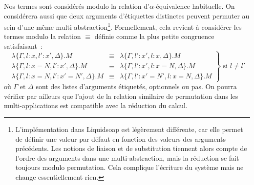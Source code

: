 \documentclass[twoside]{article}
\newcommand{\liquidsoap}{Liquidsoap}
\theoremstyle{plain}
\theoremstyle{definition}
\theoremstyle{remark}
\begin{document}
Nos termes sont considérés modulo la relation d'$\alpha$-équivalence
habituelle. On considérera aussi que deux arguments d'étiquettes distinctes
peuvent permuter au sein d'une même multi-abstraction\footnote{L'implémentation
  dans \liquidsoap{} est légèrement différente, car elle permet de définir une
  valeur par défaut en fonction des valeurs des arguments précédents. Les
  notions de liaison et de substitution tiennent alors compte de l'ordre des
  arguments dans une multi-abstraction, mais la réduction se fait toujours
  modulo permutation. Cela complique l'écriture du système mais ne change
  essentiellement rien.}. Formellement, cela revient à considérer les termes
modulo la relation $\equiv$ définie comme la plus petite congruence
satisfaisant~:
\begin{equation}
  \label{eq:permutation}
 \left.\begin{array}{rcl}
 \lambda \{ \Gamma, l:x, l':x', \Delta \}.M & \equiv &
 \lambda \{ \Gamma, l':x', l:x, \Delta \}.M \\
 \lambda \{ \Gamma, l:x=N, l':x', \Delta \}.M & \equiv &
 \lambda \{ \Gamma, l':x', l:x=N, \Delta \}.M \\
 \lambda \{ \Gamma, l:x=N, l':x'=N', \Delta \}.M & \equiv &
 \lambda \{ \Gamma, l':x'=N', l:x=N, \Delta \}.M
 \end{array}\right\}
 \mbox{ si $l\neq l'$}
\end{equation}
où $\Gamma$ et $\Delta$ sont des listes d'arguments étiquetés, optionnels ou 
pas. On pourra vérifier par ailleurs que l'ajout de la relation similaire
de permutation dans les multi-applications est compatible avec la réduction du
calcul.
\end{document}
